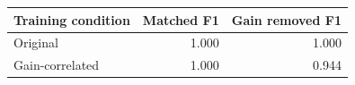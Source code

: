 \begin{tabular}{@{}lrr@{}}
\toprule
Training condition & Matched F1 & Gain removed F1 \\
\midrule
Original & 1.000 & 1.000 \\
Gain-correlated & 1.000 & 0.944 \\
\bottomrule
\end{tabular}

